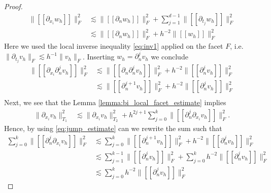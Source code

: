 \documentclass[11pt]{article}
\theoremstyle{remark}
\newcommand{\jump}[1]{\left[\!\left[ #1 \right]\!\right]}
\numberwithin{equation}{section}
\begin{document}
\begin{proof}
\begin{equation}
    \begin{split}
   \| \jump{ \partial _{x_{i}} w_{h} }   \|_{F  }^{2  } & \lesssim \| \jump{ \partial _{n} w_{h} }   \|_{F  }^{ 2 } + \sum_{j=1}^{d-1} \| \jump{ \partial _{t_{j}} w_{h} }   \|_{ F }^{ 2 } \\
    & \lesssim \| \jump{ \partial _{n} w_{h} }   \|_{F  }^{ 2 } +  h^{-2} \| \jump{ w_{h} }   \|_{ F }^{ 2 }
    \end{split}
\end{equation}
Here we used the local inverse inequality \eqref{eq:inv1} applied on the facet $F$, i.e. $\| \partial _{t_{j}} v_{h} \|_{F  }^{  } \lesssim h^{-1} \|  v_{h} \|_{F  }^{  }  $.
Inserting $w_{h} = \partial ^{j} _{n} v_{h}$ we conclude
\begin{equation}
    \label{eq:jump_estimate}
    \begin{split}
   \| \jump{ \partial _{x_{i}} \partial ^{j} _{n} v_{h} }   \|_{F  }^{2  } & \lesssim \| \jump{ \partial _{n} \partial ^{j} _{n} v_{h} }   \|_{F  }^{ 2 } +  h^{-2} \| \jump{ \partial ^{j} _{n} v_{h} }   \|_{ F }^{ 2 } \\
                                                                           & \lesssim \| \jump{  \partial ^{j+1} _{n} v_{h} }   \|_{F  }^{ 2 } +  h^{-2} \| \jump{ \partial ^{j} _{n} v_{h} }   \|_{ F }^{ 2 } \\
    \end{split}
\end{equation}
Next, we see that the Lemma \ref{lemma:bi_local_facet_estimate} implies
\begin{equation}
    \label{eq:ghost_estimate:1}
    \begin{split}
    \| \partial _{x_{i}} v_{h} \|_{  T_{1}}^{2  } & \lesssim \| \partial _{x_{i}} v_{h} \|_{ T_{2} }^{  2} + h^{2j+1}\sum_{j=0}^{k} \| \jump{ \partial _{n}^{j} \partial _{x_{i}} v_{h} }   \|_{F  }^{2  }.
    \end{split}
\end{equation}
Hence, by using \eqref{eq:jump_estimate} can we rewrite the sum such that
\begin{equation}
    \label{eq:ghost_estimate:2}
    \begin{split}
                                                  \sum_{j=0}^{k} \| \jump{ \partial _{n}^{j} \partial _{x_{i}} v_{h} }   \|_{F  }^{2  } & \lesssim  \sum_{j=0}^{k} \| \jump{  \partial ^{j+1} _{n} v_{h} }   \|_{F  }^{ 2 } +  h^{-2} \| \jump{ \partial ^{j} _{n} v_{h} }   \|_{ F }^{ 2 } \\
                                                  & \lesssim  \sum_{j=1}^{k-1} \| \jump{  \partial ^{j} _{n} v_{h} }   \|_{F  }^{ 2 } +\sum_{j=0}^{k}  h^{-2} \| \jump{ \partial ^{j} _{n} v_{h} }   \|_{ F
                                                  }^{ 2 } \\
                                                  & \lesssim  \sum_{j=0}^{k}  h^{-2} \| \jump{ \partial ^{j} _{n} v_{h} }   \|_{ F }^{ 2 }
    \end{split}
\end{equation}


\end{proof}
\end{document}

